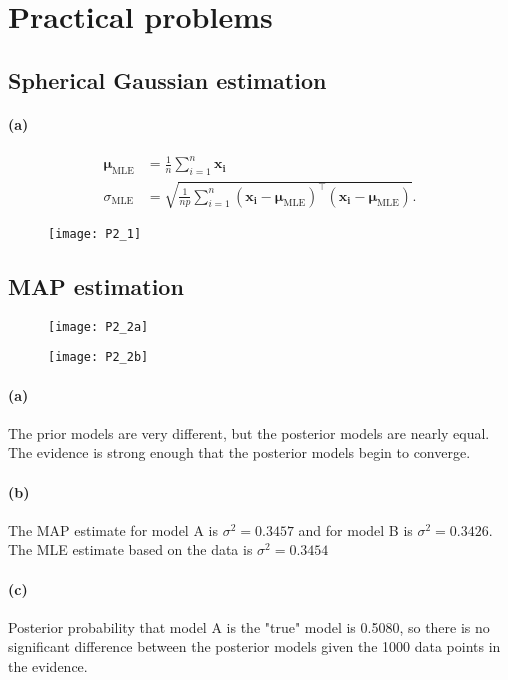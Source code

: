 \documentclass[a4paper,11pt]{article}
\begin{document}
\section{Practical problems}
\subsection{Spherical Gaussian estimation}
\paragraph{(a)}
\begin{align*}
\boldsymbol\mu_\mathrm{\scriptscriptstyle{MLE}}&=\frac{1}{n}\sum_{i=1}^n\mathbf{x_i}\\
\sigma_\mathrm{\scriptscriptstyle{MLE}}&=\sqrt{\frac{1}{np}\sum_{i=1}^n(\mathbf{x_i}-\boldsymbol\mu_\mathrm{\scriptscriptstyle{MLE}})^\top(\mathbf{x_i}-\boldsymbol\mu_\mathrm{\scriptscriptstyle{MLE}})}.
\end{align*}

\begin{figure}[!h]
  \begin{center}
    \texttt{[image: P2\_1]}
  \end{center}
\end{figure}

\clearpage
\subsection{MAP estimation}
\begin{figure}[!ht]
	\begin{center}
		\texttt{[image: P2\_2a]}
	\end{center}
\end{figure}
\begin{figure}[!hb]
	\begin{center}
		\texttt{[image: P2\_2b]}
	\end{center}
\end{figure}
\clearpage
\paragraph{(a)}
The prior models are very different, but the posterior models are nearly equal. The evidence is strong enough that the posterior models begin to converge.
\paragraph{(b)}
The MAP estimate for model A is $\sigma^2=0.3457$ and for model B is $\sigma^2=0.3426$. The MLE estimate based on the data is $\sigma^2=0.3454$\\
\paragraph{(c)}
Posterior probability that model A is the "true" model is 0.5080, so there is no significant difference between the posterior models given the 1000 data points in the evidence.\\
\end{document}
